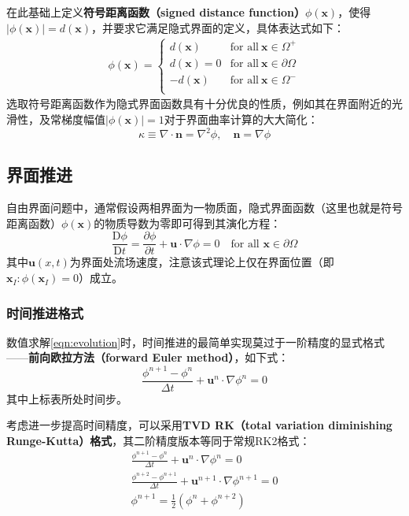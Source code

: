 \documentclass[10pt]{article}
\begin{document}
在此基础上定义\textbf{符号距离函数（signed distance function）}$\phi(\bm{x})$，使得$|\phi(\bm{x})|=d(\bm{x})$，并要求它满足隐式界面的定义，具体表达式如下：
\begin{eqnarray}
    \phi(\bm{x})=\left\{\begin{array}{rl}
        d(\bm{x})   & \text{for all}\ \bm{x}\in\Omega^+       \\
        d(\bm{x})=0 & \text{for all}\ \bm{x}\in\partial\Omega \\
        -d(\bm{x})  & \text{for all}\ \bm{x}\in\Omega^-       \\
    \end{array}\right.
    \label{eqn:sdf}
\end{eqnarray}
选取符号距离函数作为隐式界面函数具有十分优良的性质，例如其在界面附近的光滑性，及常梯度幅值$\left|\phi(\bm{x})\right|=1$对于界面曲率计算的大大简化：
\begin{equation}
    \kappa\equiv\nabla\cdot\bm{n}=\nabla^2\phi,\quad \bm{n}=\nabla\phi
\end{equation}

\subsection{界面推进}
自由界面问题中，通常假设两相界面为一物质面，隐式界面函数（这里也就是符号距离函数）$\phi(\bm{x})$的物质导数为零即可得到其演化方程：
\begin{equation}
    \frac{\mathrm{D}\phi}{\mathrm{D}t}=\frac{\partial\phi}{\partial t}+\bm{u}\cdot\nabla\phi=0\quad\text{for all }\bm{x}\in\partial\Omega
    \label{eqn:evolution}
\end{equation}
其中$\bm{u}(x,t)$为界面处流场速度，注意该式理论上仅在界面位置（即$\bm{x}_I:\phi(\bm{x}_I)=0$）成立。

\subsubsection{时间推进格式}
数值求解\autoref{eqn:evolution}时，时间推进的最简单实现莫过于一阶精度的显式格式——\textbf{前向欧拉方法（forward Euler method）}，如下式：
\begin{equation}
    \frac{\phi^{n+1}-\phi^n}{\Delta t}+\bm{u}^n\cdot\nabla\phi^n=0
\end{equation}
其中上标表所处时间步。

考虑进一步提高时间精度，可以采用\textbf{TVD RK（total variation diminishing Runge-Kutta）格式}，其二阶精度版本等同于常规RK2格式：
\begin{eqnarray}
    \frac{\phi^{n+1}-\phi^n}{\Delta t}+\bm{u}^n\cdot\nabla\phi^n=0 \\
    \frac{\phi^{n+2}-\phi^{n+1}}{\Delta t}+\bm{u}^{n+1}\cdot\nabla\phi^{n+1}=0 \\
    \phi^{n+1}=\frac{1}{2}\left(\phi^n+\phi^{n+2}\right)
\end{eqnarray}
\end{document}

